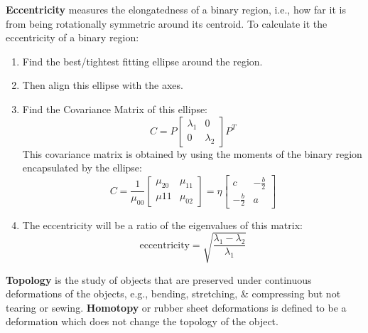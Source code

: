 \documentclass[a4paper,11pt]{article}
\begin{document}
\textbf{Eccentricity} measures the elongatedness of a binary region, i.e., how far it is from being rotationally symmetric around its centroid.
To calculate it the eccentricity of a binary region:
\begin{enumerate}
    \item   Find the best/tightest fitting ellipse around the region.
    \item   Then align this ellipse with the axes.
    \item   Find the Covariance Matrix of this ellipse:
            \[
                C = P
                \begin{bmatrix}
                    \lambda_1 & 0 \\
                    0 & \lambda_2
                \end{bmatrix}
                P^T
            \]
            This covariance matrix is obtained by using the moments of the binary region encapsulated by the ellipse:
            \[
                C = \frac{1}{\mu_{00}}
                \begin{bmatrix}
                    \mu_{20} & \mu_{11} \\
                    \mu{11} & \mu_{02}
                \end{bmatrix}
                =
                \eta
                \begin{bmatrix}
                    c & - \frac{b}{2} \\
                    -\frac{b}{2} & a
                \end{bmatrix}
            \]

    \item   The eccentricity will be a ratio of the eigenvalues of this matrix:
            \[
                \text{eccentricity} = \sqrt{\frac{\lambda_1 - \lambda_2}{\lambda_1}}
            \]
\end{enumerate}

\textbf{Topology} is the study of objects that are preserved under continuous deformations of the objects, e.g., bending, stretching, \& compressing but not tearing or sewing.
\textbf{Homotopy} or rubber sheet deformations is defined to be a deformation which does not change the topology of the object.
\end{document}
